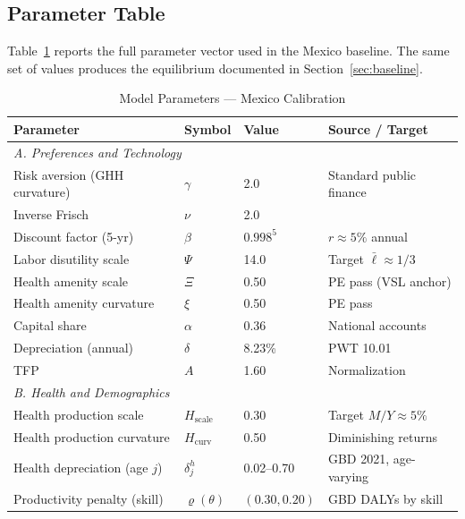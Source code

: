 \documentclass[12pt,a4paper]{article}
\begin{document}
\subsection{Parameter Table}
\label{subsec:param_table}

Table~\ref{tab:calibration} reports the full parameter vector used in
the Mexico baseline. The same set of values produces the equilibrium
documented in Section~\ref{sec:baseline}.

\begin{table}[H]
\centering
\caption{Model Parameters --- Mexico Calibration}
\label{tab:calibration}
\begin{tabular}{llll}
\hline\hline
\textbf{Parameter} & \textbf{Symbol} & \textbf{Value} & \textbf{Source / Target} \\
\hline
\multicolumn{4}{l}{\textit{A. Preferences and Technology}} \\
Risk aversion (GHH curvature) & $\gamma$    & 2.0        & Standard public finance \\
Inverse Frisch                & $\nu$       & 2.0        & \citet{FehrKindermann2018} \\
Discount factor (5-yr)        & $\beta$     & $0.998^{5}$ & $r \approx 5\%$ annual \\
Labor disutility scale        & $\Psi$      & 14.0       & Target $\bar{\ell}\approx 1/3$ \\
Health amenity scale          & $\Xi$       & 0.50       & PE pass (VSL anchor) \\
Health amenity curvature      & $\xi$       & 0.50       & PE pass \\
Capital share                 & $\alpha$    & 0.36       & National accounts \\
Depreciation (annual)         & $\delta$    & 8.23\%     & PWT 10.01 \\
TFP                           & $A$         & 1.60       & Normalization \\
\hline
\multicolumn{4}{l}{\textit{B. Health and Demographics}} \\
Health production scale       & $H_{\text{scale}}$ & 0.30  & Target $M/Y\approx 5\%$ \\
Health production curvature   & $H_{\text{curv}}$  & 0.50  & Diminishing returns \\
Health depreciation (age $j$) & $\delta^{h}_{j}$   & 0.02--0.70 & GBD 2021, age-varying \\
Productivity penalty (skill)  & $\varrho(\theta)$  & $(0.30, 0.20)$ & GBD DALYs by skill \\

\end{tabular}
\end{table}
\end{document}
